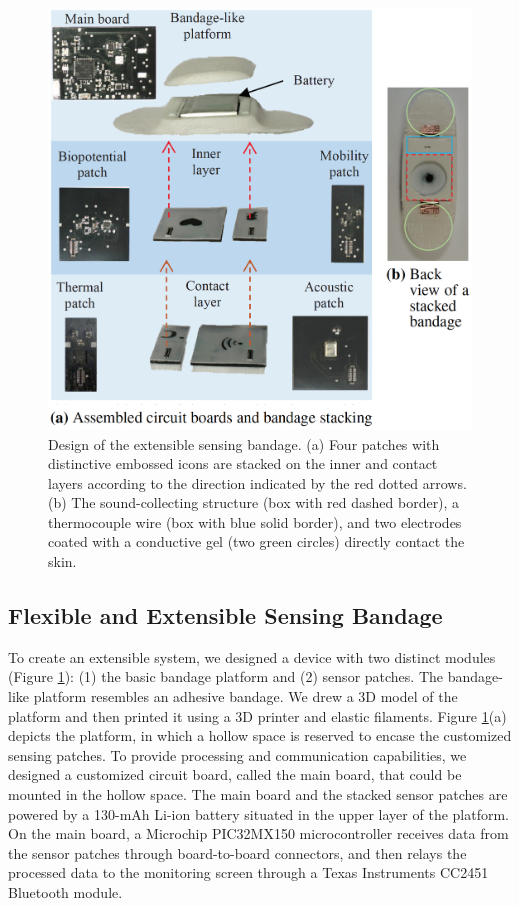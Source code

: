 \begin{figure}[!ht]
\centering
\includegraphics[width=14cm]{image/bio_fig1}
\caption{Design of the extensible sensing bandage. (a) Four patches with distinctive embossed icons are stacked on the inner and contact layers according to the direction indicated by the red dotted arrows. (b) The sound-collecting structure (box with red dashed border), a thermocouple wire (box with blue solid border), and two electrodes coated with a conductive gel (two green circles) directly contact the skin.}
\label{bandage_stacking}
\end{figure}


\subsection{Flexible and Extensible Sensing Bandage}
To create an extensible system, we designed a device with two distinct modules (Figure \ref{bandage_stacking}): (1) the basic bandage platform and (2) sensor patches. The bandage-like platform resembles an adhesive bandage. We drew a 3D model of the platform and then printed it using a 3D printer and elastic filaments. Figure \ref{bandage_stacking}(a) depicts the platform, in which a hollow space is reserved to encase the customized sensing patches. To provide processing and communication capabilities, we designed a customized circuit board, called the main board, that could be mounted in the hollow space. The main board and the stacked sensor patches are powered by a 130-mAh Li-ion battery situated in the upper layer of the platform. On the main board, a Microchip PIC32MX150 microcontroller receives data from the sensor patches through board-to-board connectors, and then relays the processed data to the monitoring screen through a Texas Instruments CC2451 Bluetooth module. \vspace{20pt}

